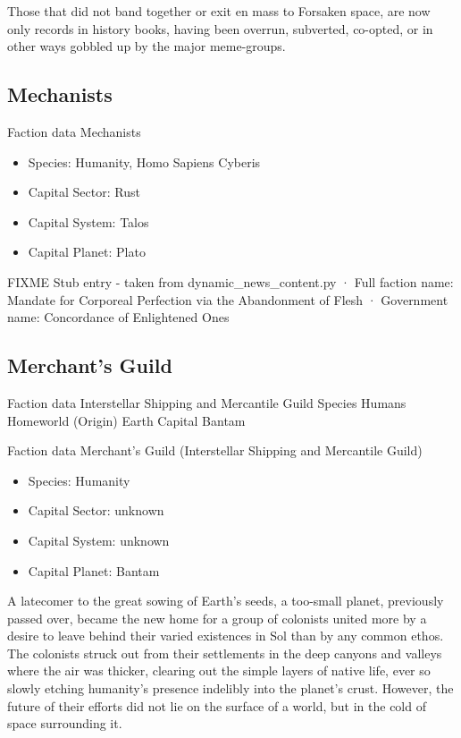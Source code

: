 Those that did not band together or exit en mass to Forsaken space,
are now only records in history books, having been overrun, subverted,
co-opted, or in other ways gobbled up by the major meme-groups.

\subsection{Mechanists}

Faction data Mechanists
\begin{itemize}
\item Species: Humanity, Homo Sapiens Cyberis
\item Capital Sector: Rust
\item Capital System: Talos
\item Capital Planet: Plato
\end{itemize}

FIXME Stub entry - taken from dynamic\_news\_content.py 
·	Full faction name: Mandate for Corporeal Perfection via the Abandonment of Flesh 
·	Government name: Concordance of Enlightened Ones 

\subsection{Merchant's Guild}

\label{OFFICIALISMGFaction}

Faction data 
Interstellar Shipping and Mercantile Guild 
Species 	Humans 
Homeworld (Origin) 	Earth 
Capital 	Bantam 

Faction data Merchant's Guild (Interstellar Shipping and Mercantile Guild)
\begin{itemize}
\item Species: Humanity
\item Capital Sector: unknown
\item Capital System: unknown
\item Capital Planet: Bantam
\end{itemize}

A latecomer to the great sowing of Earth's seeds, a too-small planet,
previously passed over, became the new home for a group of colonists
united more by a desire to leave behind their varied existences in Sol
than by any common ethos. The colonists struck out from their
settlements in the deep canyons and valleys where the air was thicker,
clearing out the simple layers of native life, ever so slowly etching
humanity's presence indelibly into the planet's crust. However, the
future of their efforts did not lie on the surface of a world, but in
the cold of space surrounding it.


